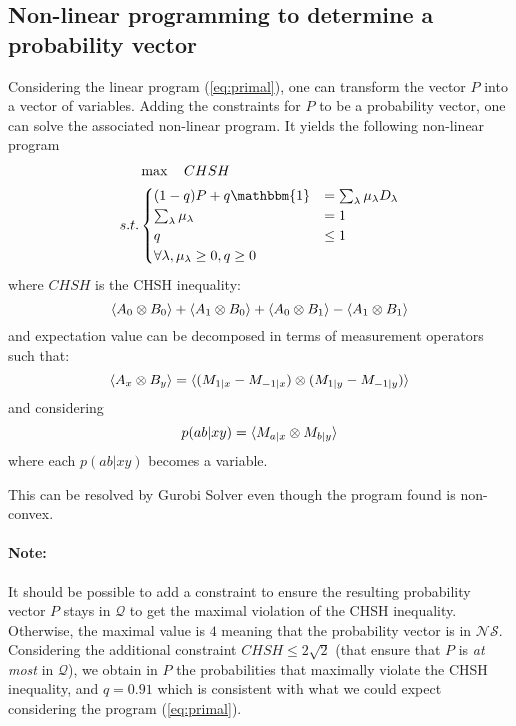 \documentclass[12pt]{article}
\newcommand{\NS}{\mathcal{NS}}
\newcommand{\Q}{\mathcal{Q}}
\newcommand{\note}{\paragraph{Note:}}
\begin{document}
\begin{multicols}{2}
\subsection*{Non-linear programming to determine a probability vector}
Considering the linear program (\ref{eq:primal}), one can transform the vector $P$
into a vector of variables. Adding the constraints for $P$ to be a probability
vector, one can solve the associated non-linear program. It yields the following
non-linear program
\begin{equation} \label{eq:primal-nl}
	\begin{aligned}
			  & \max \quad CHSH\\
		s.t.  &
		\begin{cases}
			(1-q) P + q \mathbbm{1}  & = \sum_\lambda \mu_\lambda D_\lambda \\
			\sum_\lambda \mu_\lambda & = 1 \\
			q & \leq 1 \\
			\forall \lambda, \mu_\lambda \geq 0, q \geq 0
		\end{cases}
	\end{aligned}
\end{equation}
where $CHSH$ is the CHSH inequality:
\begin{equation}
	\braket{A_0 \otimes B_0} +
	\braket{A_1 \otimes B_0} +
	\braket{A_0 \otimes B_1} -
	\braket{A_1 \otimes B_1}
\end{equation}
and expectation value can be decomposed in terms of measurement operators such that:
\begin{equation}
	\braket{A_x \otimes B_y} = \braket{(M_{1|x} - M_{-1|x})\otimes(M_{1|y} - M_{-1|y})}
\end{equation}
and considering
\begin{equation}
	p(ab|xy) = \braket{M_{a|x} \otimes M_{b|y}}
\end{equation}
where each $p(ab|xy)$ becomes a variable.

This can be resolved by Gurobi Solver \cite{gurobi} even though the program
found is non-convex.

\note It should be possible to add a constraint to ensure the resulting
probability vector $P$ stays in $\Q$ to get the maximal violation of the CHSH
inequality. Otherwise, the maximal value is $4$ meaning that the probability
vector is in $\NS$. Considering the additional constraint $CHSH \leq 2 \sqrt 2$
(that ensure that $P$ is \textit{at most} in $\Q$), we obtain in $P$ the
probabilities that maximally violate the CHSH inequality, and $q = 0.91$ which
is consistent with what we could expect considering the program
(\ref{eq:primal}).

\end{multicols}



\end{document}
